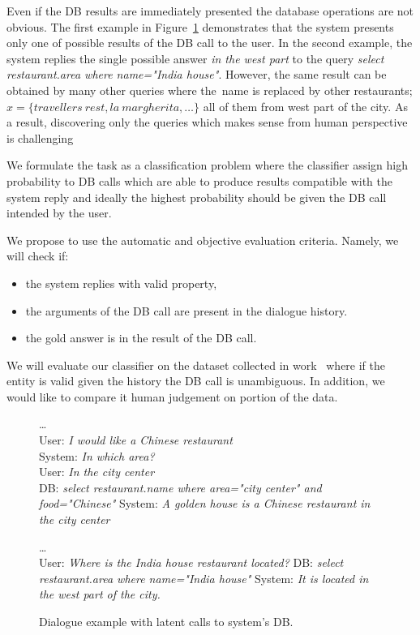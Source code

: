 \documentclass[11pt]{article}
\def\sys#1{{\color{purple}System: \it #1}}
\def\usr#1{{\color{brown}User: \it #1}}
\def\api#1{{\color{green}DB: \it #1}}
\begin{document}
Even if the DB results are immediately presented the database operations are not obvious.  
The first example in Figure~\ref{fig:apicall} demonstrates that the system presents only one of possible results of the DB call to the user.
In the second example, the system replies the single possible answer {\it in the west part} to the query {\it select restaurant.area where name="India house"}.
However, the same result can be obtained by many other queries where the~name is replaced by other restaurants; $x=\{travellers\ rest, la\ margherita, \ldots\}$ all of them from west part of the city.
As a result, discovering only the queries which makes sense from human perspective is challenging 

We formulate the task as a classification problem where the classifier assign high probability to DB calls which are able to produce results compatible with the system reply and ideally the highest probability should be given the DB call intended by the user.

We propose to use the automatic and objective evaluation criteria. 
Namely, we will check if:
\begin{itemize}
    \item the system replies with valid property,
    \item the arguments of the DB call are present in the dialogue history.
    \item the gold answer is in the result of the DB call.
\end{itemize}
We will evaluate our classifier on the dataset collected in work~\cite{platek2016wochat} where if the entity is valid given the history the DB call is unambiguous. 
In addition, we would like to compare it human judgement on portion of the data.
\begin{figure}[!ht]
    \dots \\
    \usr{I would like a Chinese restaurant} \\
    \sys{In which area?} \\
    \usr{In the city center} \\
    \api{select restaurant.name where area="city center" and food="Chinese"}
    \sys{A golden house is a Chinese restaurant in the city center} 

    \dots \\
    \usr{Where is the India house restaurant located?}
    \api{select restaurant.area where name="India house"}
    \sys{It is located in the west part of the city.}
    \caption{Dialogue example with latent calls to system's DB.}
\label{fig:apicall}
\end{figure}
\end{document}

